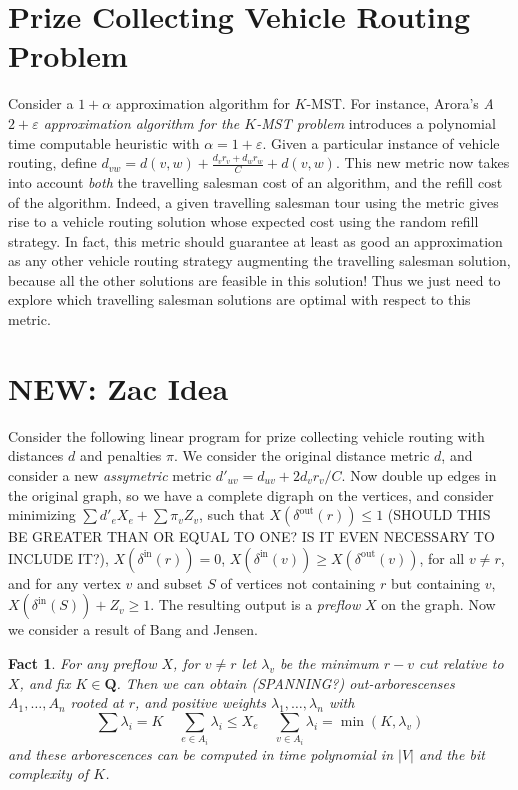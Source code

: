 \documentclass{article}
\theoremstyle{plain}
\newtheorem{fact}{Fact}
\theoremstyle{plain}
\begin{document}
\section{Prize Collecting Vehicle Routing Problem}

Consider a $1 + \alpha$ approximation algorithm for $K$-MST. For instance, Arora's {\it A $2 + \varepsilon$ approximation algorithm for the $K$-MST problem} introduces a polynomial time computable heuristic with $\alpha = 1 + \varepsilon$. Given a particular instance of vehicle routing, define $d_{vw} = d(v,w) + \frac{d_vr_v + d_wr_w}{C} + d(v,w)$. This new metric now takes into account {\it both} the travelling salesman cost of an algorithm, and the refill cost of the algorithm. Indeed, a given travelling salesman tour using the metric gives rise to a vehicle routing solution whose expected cost using the random refill strategy. In fact, this metric should guarantee at least as good an approximation as any other vehicle routing strategy augmenting the travelling salesman solution, because all the other solutions are feasible in this solution! Thus we just need to explore which travelling salesman solutions are optimal with respect to this metric.

\section{NEW: Zac Idea}

Consider the following linear program for prize collecting vehicle routing with distances $d$ and penalties $\pi$. We consider the original distance metric $d$, and consider a new {\it assymetric} metric $d'_{uv} = d_{uv} + 2 d_vr_v/C$. Now double up edges in the original graph, so we have a complete digraph on the vertices, and consider minimizing $\sum d'_e X_e + \sum \pi_v Z_v$, such that $X(\delta^{\text{out}}(r)) \leq 1$ (SHOULD THIS BE GREATER THAN OR EQUAL TO ONE? IS IT EVEN NECESSARY TO INCLUDE IT?), $X(\delta^{\text{in}}(r)) = 0$, $X(\delta^{\text{in}}(v)) \geq X(\delta^{\text{out}}(v))$, for all $v \neq r$, and for any vertex $v$ and subset $S$ of vertices not containing $r$ but containing $v$, $X(\delta^{\text{in}}(S)) + Z_v \geq 1$. The resulting output is a {\it preflow} $X$ on the graph. Now we consider a result of Bang and Jensen.

\begin{fact}
    For any preflow $X$, for $v \neq r$ let $\lambda_v$ be the minimum $r-v$ cut relative to $X$, and fix $K \in \mathbf{Q}$. Then we can obtain (SPANNING?) out-arborescenses $A_1, \dots, A_n$ rooted at $r$, and positive weights $\lambda_1, \dots, \lambda_n$ with
    \[ \sum \lambda_i = K\ \ \ \ \ \sum_{e \in A_i} \lambda_i \leq X_e\ \ \ \ \ \sum_{v \in A_i} \lambda_i = \min(K,\lambda_v) \]
    and these arborescences can be computed in time polynomial in $|V|$ and the bit complexity of $K$.
\end{fact}
\end{document}
